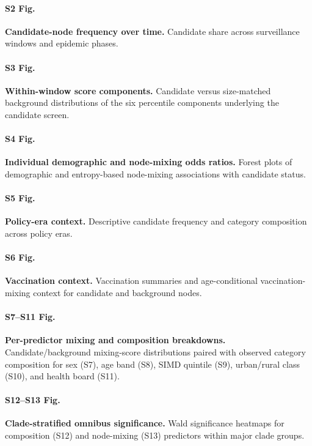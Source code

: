\documentclass[10pt,letterpaper]{article}
\begin{document}
\paragraph*{S2 Fig.}
{\bf Candidate-node frequency over time.} Candidate share across surveillance windows and epidemic phases.

\paragraph*{S3 Fig.}
{\bf Within-window score components.} Candidate versus size-matched background distributions of the six percentile components underlying the candidate screen.

\paragraph*{S4 Fig.}
{\bf Individual demographic and node-mixing odds ratios.} Forest plots of demographic and entropy-based node-mixing associations with candidate status.

\paragraph*{S5 Fig.}
{\bf Policy-era context.} Descriptive candidate frequency and category composition across policy eras.

\paragraph*{S6 Fig.}
{\bf Vaccination context.} Vaccination summaries and age-conditional vaccination-mixing context for candidate and background nodes.

\paragraph*{S7--S11 Fig.}
{\bf Per-predictor mixing and composition breakdowns.} Candidate/background mixing-score distributions paired with observed category composition for sex (S7), age band (S8), SIMD quintile (S9), urban/rural class (S10), and health board (S11).

\paragraph*{S12--S13 Fig.}
{\bf Clade-stratified omnibus significance.} Wald significance heatmaps for composition (S12) and node-mixing (S13) predictors within major clade groups.
\end{document}
